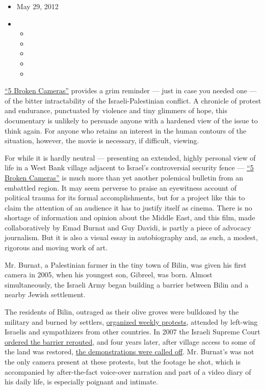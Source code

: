 \begin{itemize}
\item
  May 29, 2012
\item
  \begin{itemize}
  \item
  \item
  \item
  \item
  \item
  \end{itemize}
\end{itemize}

\href{http://vimeo.com/15843191}{``5 Broken Cameras''} provides a grim
reminder --- just in case you needed one --- of the bitter
intractability of the Israeli-Palestinian conflict. A chronicle of
protest and endurance, punctuated by violence and tiny glimmers of hope,
this documentary is unlikely to persuade anyone with a hardened view of
the issue to think again. For anyone who retains an interest in the
human contours of the situation, however, the movie is necessary, if
difficult, viewing.

For while it is hardly neutral --- presenting an extended, highly
personal view of life in a West Bank village adjacent to Israel's
controversial security fence ---
\href{http://www.nytimes.com/2012/01/23/world/middleeast/documentary-from-emad-burnats-camera-competes-at-sundance.html}{``5
Broken Cameras''} is much more than yet another polemical bulletin from
an embattled region. It may seem perverse to praise an eyewitness
account of political trauma for its formal accomplishments, but for a
project like this to claim the attention of an audience it has to
justify itself as cinema. There is no shortage of information and
opinion about the Middle East, and this film, made collaboratively by
Emad Burnat and Guy Davidi, is partly a piece of advocacy journalism.
But it is also a visual essay in autobiography and, as such, a modest,
rigorous and moving work of art.

Mr. Burnat, a Palestinian farmer in the tiny town of Bilin, was given
his first camera in 2005, when his youngest son, Gibreel, was born.
Almost simultaneously, the Israeli Army began building a barrier between
Bilin and a nearby Jewish settlement.

The residents of Bilin, outraged as their olive groves were bulldozed by
the military and burned by settlers,
\href{http://www.nytimes.com/2009/08/28/world/middleeast/28bilin.html?ref=middleeast}{organized
weekly protests}, attended by left-wing Israelis and sympathizers from
other countries. In 2007 the Israeli Supreme Court
\href{http://www.nytimes.com/2007/09/05/world/middleeast/05mideast.html}{ordered
the barrier rerouted}, and four years later, after village access to
some of the land was restored,
\href{http://www.nytimes.com/2011/06/25/world/middleeast/25palestinians.html}{the
demonstrations were called off}. Mr. Burnat's was not the only camera
present at these protests, but the footage he shot, which is accompanied
by after-the-fact voice-over narration and part of a video diary of his
daily life, is especially poignant and intimate.

